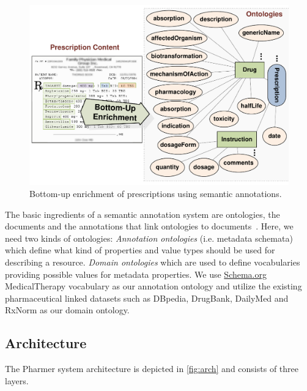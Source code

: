 \documentclass[10pt, conference, compsocconf]{IEEEtran}
\begin{document}
\begin{figure}[tb]
	\centering
		\includegraphics[width=1.0\columnwidth]{images/approaches.pdf}
	\caption{Bottom-up enrichment of prescriptions using semantic annotations.}
	\label{fig:botup}
\end{figure}

The basic ingredients of a semantic annotation system are ontologies, the documents and the annotations that link ontologies to documents~\cite{khalili2012}.
Here, we need two kinds of ontologies:
\emph{Annotation ontologies} (i.e. metadata schemata) which define what kind of properties and value types should be used for describing a resource.
\emph{Domain ontologies} which are used to define vocabularies providing possible values for metadata properties.
We use \url{Schema.org} MedicalTherapy vocabulary as our annotation ontology and utilize the existing pharmaceutical linked datasets such as DBpedia, DrugBank, DailyMed and RxNorm as our domain ontology.


\subsection{Architecture}

The Pharmer system architecture is depicted in \autoref{fig:arch} and consists of three layers.
\end{document}
